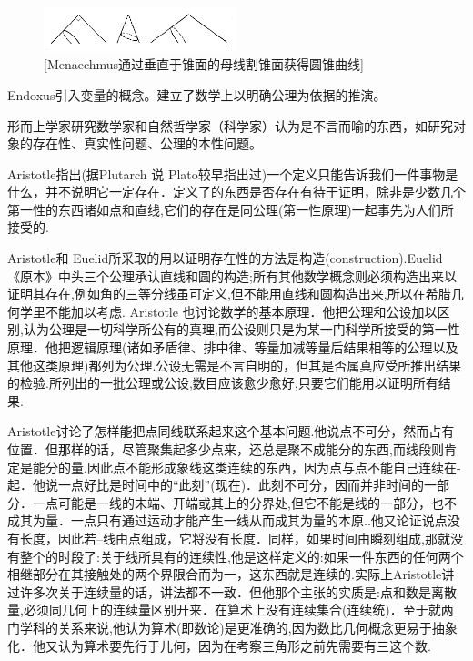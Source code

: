 \documentclass[UTF8]{../09-Mathematics}
\begin{document}
\begin{figure}[h]
    \centering
    \includegraphics[width=0.5\textwidth]{./resources/古今数学思想-图3_12.png}
    \caption{[Menaechmus通过垂直于锥面的母线割锥面获得圆锥曲线]}
    \label{fig:5}
\end{figure}

Endoxus引入变量的概念。建立了数学上以明确公理为依据的推演。

形而上学家研究数学家和自然哲学家（科学家）认为是不言而喻的东西，如研究对象的存在性、真实性问题、公理的本性问题。

Aristotle指出(据Plutarch 说 Plato较早指出过)一个定义只能告诉我们一件事物是什么，并不说明它一定存在．定义了的东西是否存在有待于证明，除非是少数几个第一性的东西诸如点和直线,它们的存在是同公理(第一性原理)一起事先为人们所接受的.

Aristotle和 Euelid所采取的用以证明存在性的方法是构造(construction).Euelid 《原本》中头三个公理承认直线和圆的构造;所有其他数学概念则必须构造出来以证明其存在,例如角的三等分线虽可定义,但不能用直线和圆构造出来,所以在希腊几何学里不能加以考虑.
Aristotle 也讨论数学的基本原理．他把公理和公设加以区别,认为公理是一切科学所公有的真理,而公设则只是为某一门科学所接受的第一性原理．他把逻辑原理(诸如矛盾律、排中律、等量加减等量后结果相等的公理以及其他这类原理)都列为公理.公设无需是不言自明的，但其是否属真应受所推出结果的检验.所列出的一批公理或公设,数目应该愈少愈好,只要它们能用以证明所有结果.

Aristotle讨论了怎样能把点同线联系起来这个基本问题.他说点不可分，然而占有位置．但那样的话，尽管聚集起多少点来，还总是聚不成能分的东西,而线段则肯定是能分的量.因此点不能形成象线这类连续的东西，因为点与点不能自己连续在-起．他说一点好比是时间中的“此刻”(现在)．此刻不可分，因而并非时间的一部分．一点可能是一线的末端、开端或其上的分界处,但它不能是线的一部分，也不成其为量．一点只有通过运动才能产生一线从而成其为量的本原..他又论证说点没有长度，因此若--线由点组成，它将没有长度．同样，如果时间由瞬刻组成,那就没有整个的时段了:关于线所具有的连续性,他是这样定义的:如果一件东西的任何两个相继部分在其接触处的两个界限合而为一，这东西就是连续的.实际上Aristotle讲过许多次关于连续量的话，讲法都不一致．但他那个主张的实质是:点和数是离散量,必须同几何上的连续量区别开来．在算术上没有连续集合(连续统)．至于就两门学科的关系来说,他认为算术(即数论)是更准确的,因为数比几何概念更易于抽象化．他又认为算术要先行于儿何，因为在考察三角形之前先需要有三这个数.
\end{document}
